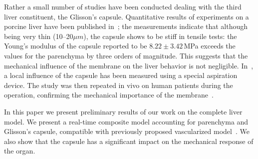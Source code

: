 Rather a small number of studies have been conducted dealing with the third liver constituent, the  Glisson's capsule.
Quantitative results of experiments on a porcine liver have been published in~\cite{Umale2011}; the measurements indicate that although being very 
thin (10--20$\mu m$), the capsule shows to be stiff in tensile tests: the Young's modulus of the capsule reported to be $8.22\pm3.42$\,MPa 
exceeds the values for the parenchyma by three orders of magnitude.
This suggests that the mechanical influence of the membrane on the liver behavior is not negligible.
%
In~\cite{Hollenstein2006}, a local influence of the capsule has been measured using a special aspiration device. The study was then repeated 
in vivo on human patients during the operation, confirming the mechanical importance of the membrane~\cite{Ahn2010,Nava2008}.

In this paper we present preliminary results of our work on the complete liver model. 
We present a real-time composite model accounting for parenchyma and Glisson's capsule, compatible with previously proposed vascularized model~\cite{Peterlik2012}.
We also show that the capsule has a significant impact on the mechanical response of the organ. 
 

